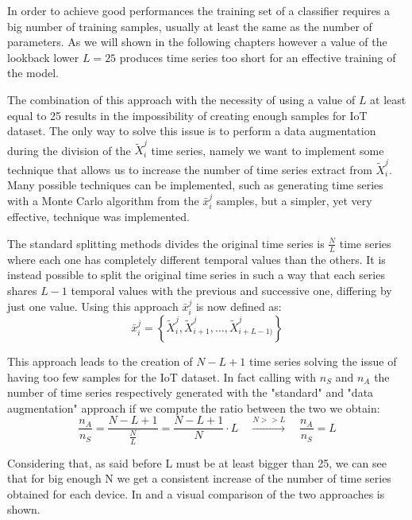 In order to achieve good performances the training set of a classifier requires a big number of training samples, usually at least the same as the number of parameters. As we will shown in the following chapters however a value of the lookback lower $L=25$ produces time series too short for an effective training of the model. 

The combination of this approach with the necessity of using a value of $L$ at least equal to 25 results in the impossibility of creating enough samples for IoT dataset. The only way to solve this issue is to perform a data augmentation during the division of the ${\tilde{X}_i^j}$ time series, namely we want to implement some technique that allows us to increase the number of time series extract from ${\tilde{X}_i^j}$. Many possible techniques can be implemented, such as generating time series with a Monte Carlo algorithm from the $\bar{x}_i^j$ samples, but a simpler, yet very effective, technique was implemented.

The standard splitting methods divides the original time series is $\frac{N}{L}$ time series where each one has completely different temporal values than the others. It is instead possible to split the original time series in such a way that each series shares $L-1$ temporal values with the previous and successive one, differing by just one value. Using this approach $\bar{x}_i^j$
is now defined as:
\begin{equation}
    \bar{x}_i^j = \left\{\tilde{X}_{i}^j, \tilde{X}_{i +1 }^j, \dots, \tilde{X}_{i+L-1)}^j  \right\}
\end{equation}

This approach leads to the creation of $N-L+1$ time series solving the issue of having too few samples for the IoT dataset. In fact calling with $n_S$ and $n_A$ the number of time series respectively generated with the "standard" and "data augmentation" approach if we compute the ratio between the two we obtain:
\begin{equation}
    \frac{n_A}{n_S} = \frac{N-L+1}{\frac{N}{L}} = \frac{N-L+1}{N}\cdot L \quad \xrightarrow{N>>L}
    \quad \frac{n_A}{n_S}= L 
\end{equation}

Considering that, as said before L must be at least bigger than 25, we can see that for big enough N we get a consistent increase of the number of time series obtained for each device. In
 and  a visual comparison of the two approaches is shown.


